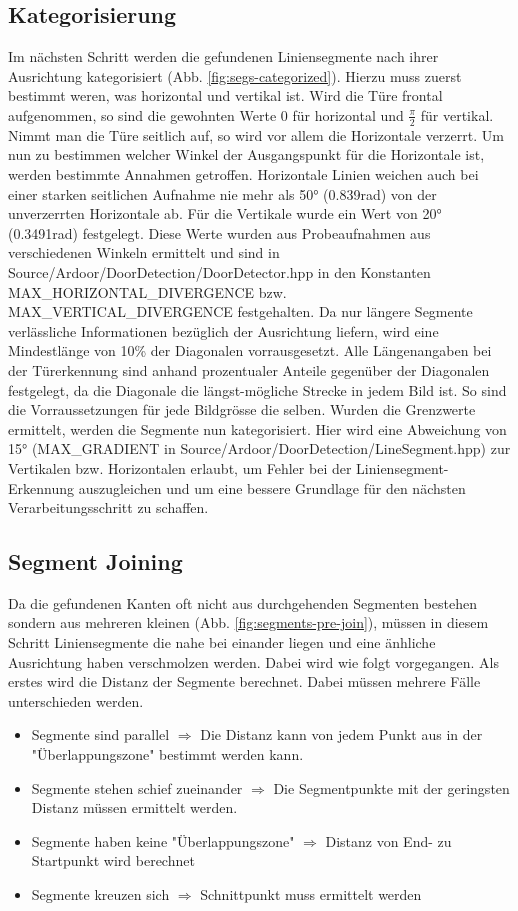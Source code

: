 \subsection{Kategorisierung}
Im nächsten Schritt werden die gefundenen Liniensegmente nach ihrer Ausrichtung kategorisiert (Abb. \ref{fig:segs-categorized}). Hierzu muss zuerst bestimmt weren, was horizontal und vertikal ist. Wird die Türe frontal aufgenommen, so sind  die gewohnten Werte $0$ für horizontal und $\frac{\pi}{2}$ für vertikal. Nimmt man die Türe seitlich auf, so wird vor allem die Horizontale verzerrt. Um nun zu bestimmen welcher Winkel der Ausgangspunkt für die Horizontale ist, werden bestimmte Annahmen getroffen. Horizontale Linien weichen auch bei einer starken seitlichen Aufnahme nie mehr als 50° (0.839rad) von der unverzerrten Horizontale ab. Für die Vertikale wurde ein Wert von 20° (0.3491rad) festgelegt. Diese Werte wurden aus Probeaufnahmen aus verschiedenen Winkeln ermittelt und sind in Source/Ardoor/DoorDetection/DoorDetector.hpp in den Konstanten MAX\_HORIZONTAL\_DIVERGENCE bzw. MAX\_VERTICAL\_DIVERGENCE festgehalten. Da nur längere Segmente verlässliche Informationen bezüglich der Ausrichtung liefern, wird eine Mindestlänge von 10\% der Diagonalen vorrausgesetzt. Alle Längenangaben bei der Türerkennung sind anhand prozentualer Anteile gegenüber der Diagonalen festgelegt, da die Diagonale die längst-mögliche Strecke in jedem Bild ist. So sind die Vorraussetzungen für jede Bildgrösse die selben. Wurden die Grenzwerte ermittelt, werden die Segmente nun kategorisiert. Hier wird eine Abweichung von 15° (MAX\_GRADIENT in Source/Ardoor/DoorDetection/LineSegment.hpp) zur Vertikalen bzw. Horizontalen erlaubt, um Fehler bei der Liniensegment-Erkennung auszugleichen und um eine bessere Grundlage für den nächsten Verarbeitungsschritt zu schaffen.

\subsection{Segment Joining}
Da die gefundenen Kanten oft nicht aus durchgehenden Segmenten bestehen sondern aus mehreren kleinen (Abb. \ref{fig:segments-pre-join}), müssen in diesem Schritt Liniensegmente die nahe bei einander liegen und eine änhliche Ausrichtung haben verschmolzen werden. Dabei wird wie folgt vorgegangen. Als erstes wird die Distanz der Segmente berechnet. Dabei müssen mehrere Fälle unterschieden werden.

\begin{itemize}
	\item Segmente sind parallel $\Rightarrow$ Die Distanz kann von jedem Punkt aus in der "Überlappungszone" bestimmt werden kann.
	\item Segmente stehen schief zueinander $\Rightarrow$ Die Segmentpunkte mit der geringsten Distanz müssen ermittelt werden.
	\item Segmente haben keine "Überlappungszone" $\Rightarrow$ Distanz von End- zu Startpunkt wird berechnet
	\item Segmente kreuzen sich $\Rightarrow$ Schnittpunkt muss ermittelt werden
\end{itemize}

